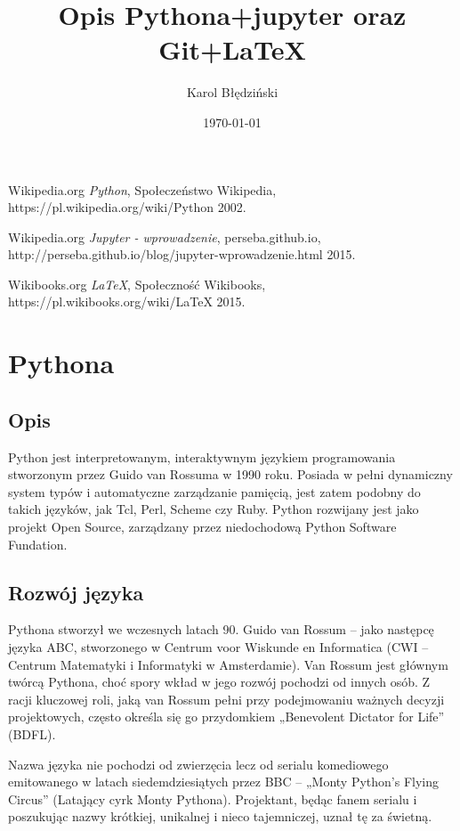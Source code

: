 \documentclass{article}
\title{Opis Pythona+jupyter oraz Git+LaTeX}
\date{\today}
\author{Karol Błędziński}
\begin{document}
  \maketitle
  \begin{thebibliography}{9}

  Wikipedia.org
  \textit{ Python},
  Społeczeństwo Wikipedia,
  https://pl.wikipedia.org/wiki/Python
  2002.

  Wikipedia.org
  \textit{Jupyter - wprowadzenie},
  perseba.github.io,
  http://perseba.github.io/blog/jupyter-wprowadzenie.html
  2015.

  Wikibooks.org
  \textit{LaTeX},
  Społeczność Wikibooks,
  https://pl.wikibooks.org/wiki/LaTeX
  2015.


\end{thebibliography}
  \newpage

\section{Pythona}
\subsection{Opis}
	Python jest interpretowanym, interaktywnym językiem programowania stworzonym przez Guido van Rossuma w 1990 roku. Posiada w pełni dynamiczny system typów i automatyczne zarządzanie pamięcią, jest zatem podobny do takich języków, jak Tcl, Perl, Scheme czy Ruby. Python rozwijany jest jako projekt Open Source, zarządzany przez niedochodową Python Software Fundation.
\subsection{Rozwój języka}
	Pythona stworzył we wczesnych latach 90. Guido van Rossum – jako następcę języka ABC, stworzonego w Centrum voor Wiskunde en Informatica (CWI – Centrum Matematyki i Informatyki w Amsterdamie). Van Rossum jest głównym twórcą Pythona, choć spory wkład w jego rozwój pochodzi od innych osób. Z racji kluczowej roli, jaką van Rossum pełni przy podejmowaniu ważnych decyzji projektowych, często określa się go przydomkiem „Benevolent Dictator for Life” (BDFL).

Nazwa języka nie pochodzi od zwierzęcia lecz od serialu komediowego emitowanego w latach siedemdziesiątych przez BBC – „Monty Python’s Flying Circus” (Latający cyrk Monty Pythona). Projektant, będąc fanem serialu i poszukując nazwy krótkiej, unikalnej i nieco tajemniczej, uznał tę za świetną.
\end{document}
